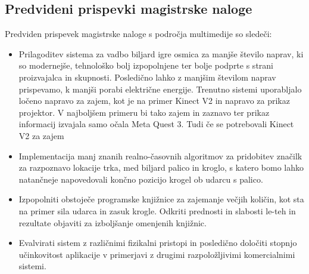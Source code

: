 \documentclass[a4paper, 12pt]{article}
\begin{document}
\subsection{Predvideni prispevki magistrske naloge}
Predviden prispevek magistrske naloge s področja multimedije so sledeči:
\begin{itemize}
    \item Prilagoditev sistema za vadbo biljard igre osmica za manjše število naprav, ki so modernejše, tehnološko bolj izpopolnjene ter bolje podprte s strani proizvajalca in skupnosti. Posledično lahko z manjšim številom naprav prispevamo, k manjši porabi električne energije. Trenutno sistemi uporabljalo ločeno napravo za zajem, kot je na primer Kinect V2 in napravo za prikaz projektor. V najboljšem primeru bi tako zajem in zaznavo ter prikaz informacij izvajala samo očala Meta Quest 3. Tudi če se potrebovali Kinect V2 za zajem 
    \item Implementacija manj znanih realno-časovnih algoritmov za pridobitev značilk za razpoznavo lokacije trka, med biljard palico in kroglo, s katero bomo lahko natančneje napovedovali končno pozicijo krogel ob udarcu s palico.
    \item Izpopolniti obstoječe programske knjižnice za zajemanje večjih količin, kot sta na primer sila udarca in zasuk krogle. Odkriti prednosti in slabosti le-teh in rezultate objaviti za izboljšanje omenjenih knjižnic.
    \item Evalvirati sistem z različnimi fizikalni pristopi in posledično določiti stopnjo učinkovitost aplikacije v primerjavi z drugimi razpoložljivimi komercialnimi sistemi.
\end{itemize}
\end{document}
